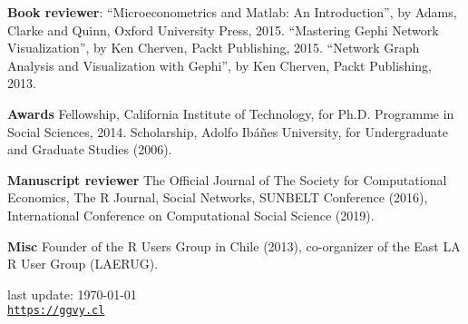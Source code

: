 \documentclass[letterpaper, 11pt]{article}
\def\footerlink{https://ggvy.cl}
\renewenvironment{itemize}{
  \begin{list}{}{
    \setlength{\leftmargin}{0.45cm}
  }
}{
  \end{list}
}
\begin{document}
\begin{itemize}
\item \textbf{Book reviewer}: ``Microeconometrics and Matlab: An Introduction'', by Adams, Clarke and Quinn, Oxford University Press, 2015. ``Mastering Gephi Network Visualization'', by Ken Cherven, Packt Publishing, 2015. ``Network Graph Analysis and Visualization with Gephi'', by Ken Cherven, Packt Publishing, 2013.
\item \textbf{Awards} Fellowship, California Institute of Technology, for Ph.D. Programme in Social Sciences, 2014. Scholarship, Adolfo Ib\'a\~nes University, for Undergraduate and Graduate Studies (2006).
\item \textbf{Manuscript reviewer} The Official Journal of The Society for Computational Economics, The R Journal, Social Networks, SUNBELT Conference (2016), International Conference on Computational Social Science (2019).
\item \textbf{Misc} Founder of the R Users Group in Chile (2013), co-organizer of the East LA R User Group (LAERUG).
\end{itemize}

\bigskip

\begin{center}
 \begin{footnotesize}
   last update: \today \\
   \href{\footerlink}{\texttt{\footerlink}}
 \end{footnotesize}
\end{center}
\end{document}
